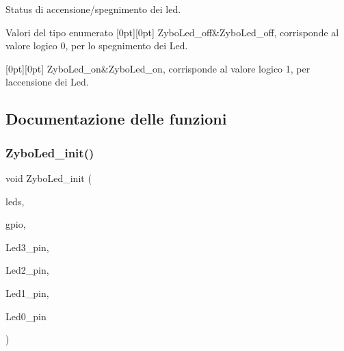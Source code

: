 Status di accensione/spegnimento dei led. 

\begin{DoxyEnumFields}{Valori del tipo enumerato}
[0pt][0pt]{}\mbox{\label{group___led_gga3dcb274f22e577705c49944b8d1f4b12a9679f1c302afdb51915a2331b4ec92f3}} 
Zybo\+Led\+\_\+off&Zybo\+Led\+\_\+off, corrisponde al valore logico \textquotesingle{}0\textquotesingle{}, per lo spegnimento dei Led. \\
\hline

[0pt][0pt]{}\mbox{\label{group___led_gga3dcb274f22e577705c49944b8d1f4b12aafcf0ae16a6edec807c06bb0a99f7e8b}} 
Zybo\+Led\+\_\+on&Zybo\+Led\+\_\+on, corrisponde al valore logico \textquotesingle{}1\textquotesingle{}, per l\textquotesingle{}accensione dei Led. \\
\hline

\end{DoxyEnumFields}


\subsection{Documentazione delle funzioni}
\mbox{\label{group___led_ga51bccd37e6ae8cd32e2c50c60a5e83cc}} 
\subsubsection{\texorpdfstring{Zybo\+Led\+\_\+init()}{ZyboLed\_init()}}
{\footnotesize\ttfamily void Zybo\+Led\+\_\+init (\begin{DoxyParamCaption}\item[{\hyperlink{struct_zybo_led__t}{Zybo\+Led\+\_\+t} $\ast$}]{leds,  }\item[{\hyperlink{structmy_g_p_i_o__t}{my\+G\+P\+I\+O\+\_\+t} $\ast$}]{gpio,  }\item[{\hyperlink{group__bare-metal_ga402a0d20afc0cb7c25554b8b023f4253}{my\+G\+P\+I\+O\+\_\+mask}}]{Led3\+\_\+pin,  }\item[{\hyperlink{group__bare-metal_ga402a0d20afc0cb7c25554b8b023f4253}{my\+G\+P\+I\+O\+\_\+mask}}]{Led2\+\_\+pin,  }\item[{\hyperlink{group__bare-metal_ga402a0d20afc0cb7c25554b8b023f4253}{my\+G\+P\+I\+O\+\_\+mask}}]{Led1\+\_\+pin,  }\item[{\hyperlink{group__bare-metal_ga402a0d20afc0cb7c25554b8b023f4253}{my\+G\+P\+I\+O\+\_\+mask}}]{Led0\+\_\+pin }\end{DoxyParamCaption})}



